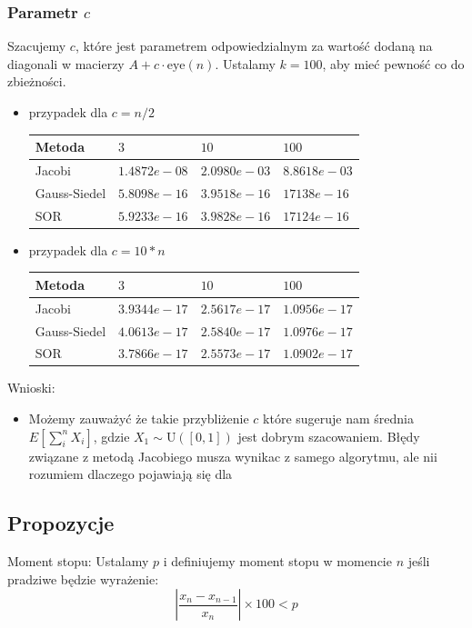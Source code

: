 \subsubsection{Parametr $c$}
Szacujemy \( c \), które jest parametrem odpowiedzialnym za wartość dodaną na diagonali w macierzy \( A + c \cdot \text{eye}(n) \). Ustalamy \( k = 100 \), aby mieć pewność co do zbieżności.
\begin{itemize}
    \item przypadek dla $c = n/2$
\begin{center}
\begin{tabular}{|l|l|l|l|}
\hline
Metoda       & $3$            & $10$           & $100$          \\ \hline
Jacobi       & $1.4872e-08$ & $2.0980e-03$ & $8.8618e-03$ \\ \hline
Gauss-Siedel & $5.8098e-16$ & $3.9518e-16$ & $17138e-16$  \\ \hline
SOR          & $5.9233e-16$ & $3.9828e-16$ & $17124e-16$  \\ \hline
\end{tabular}
\end{center}
    \item przypadek dla $c = 10*n$
    \begin{center}
\begin{tabular}{|l|l|l|l|}
\hline
Metoda       & $3$            & $10$           & $100$          \\ \hline
Jacobi       & $3.9344e-17$ & $2.5617e-17$ & $1.0956e-17$ \\ \hline
Gauss-Siedel & $4.0613e-17$ & $2.5840e-17$ & $1.0976e-17$ \\ \hline
SOR          & $3.7866e-17$ & $2.5573e-17$ & $1.0902e-17$ \\ \hline
\end{tabular}
    \end{center}
\end{itemize}
Wnioski:\\
\begin{itemize}
    \item Możemy zauważyć że takie przybliżenie $c$ które sugeruje nam średnia $E[\sum_i^n X_i]$, gdzie $X_1 \sim \mathrm{U}([0, 1])$ jest dobrym szacowaniem. Błędy związane z metodą Jacobiego musza wynikac z samego algorytmu, ale nii rozumiem dlaczego pojawiają się dla 
\end{itemize}

\subsection{Propozycje}
Moment stopu:
Ustalamy $p$ i definiujemy moment stopu w momencie $n$ jeśli pradziwe będzie wyrażenie:
$$\left|\frac{x_n - x_{n-1}}{x_n}\right| \times 100 < p$$
